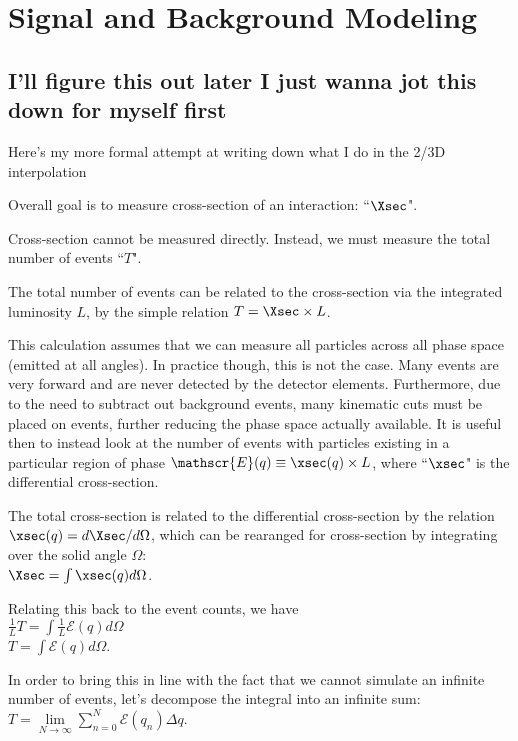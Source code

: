 \chapter{Signal and Background Modeling}


\section{I'll figure this out later I just wanna jot this down for myself first}
    Here's my more formal attempt at writing down what I do in the 2/3D interpolation

    Overall goal is to measure cross-section of an interaction: ``$\Xsec$".

    Cross-section cannot be measured directly. Instead, we must measure the total number of events ``$T$". 

    The total number of events can be related to the cross-section via the integrated luminosity $L$, by the simple relation $T = \Xsec \times L$.

    This calculation assumes that we can measure all particles across all phase space (emitted at all angles). In practice though, this is not the case.
    Many events are very forward and are never detected by the detector elements.
    Furthermore, due to the need to subtract out background events, many kinematic cuts must be placed on events, further reducing the phase space actually available.
    It is useful then to instead look at the number of events with particles existing in a particular region of phase $\mathscr{E} (q) \equiv \xsec (q) \times L$, where ``$\xsec$" is the differential cross-section.

    The total cross-section is related to the differential cross-section by the relation \\
    $\xsec (q) = d \Xsec / d \Omega$, which can be rearanged for cross-section by integrating over the solid angle $\Omega$: \\
    $\Xsec = \int \xsec  (q) d \Omega$.

    Relating this back to the event counts, we have\\
    $\frac{1}{L} T = \int \frac{1}{L} \mathscr{E} (q) d\Omega $ \\
    $T = \int \mathscr{E} (q) d\Omega $.

    In order to bring this in line with the fact that we cannot simulate an infinite number of events, let's decompose the integral into an infinite sum:\\
    $T = \lim\limits_{N\to\infty} \sum\limits_{n=0}^{N} \mathscr{E}(q_n) \Delta q $.


